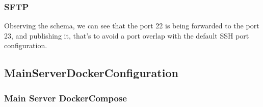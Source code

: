     \subsubsection[SFTP]{SFTP}
    \begin{flushleft}
        Observing the schema, we can see that the port 22 is being forwarded to the port 23, and publishing it, that's
        to avoid a port overlap with the default SSH port configuration.
    \end{flushleft}



    \newpage
    \subsection[Main Server Docker Configuration]{MainServerDockerConfiguration}\label{subsec:mainserverdockerconfiguration}
    \subsubsection[Main Server Docker-Compose]{Main Server DockerCompose}
    
